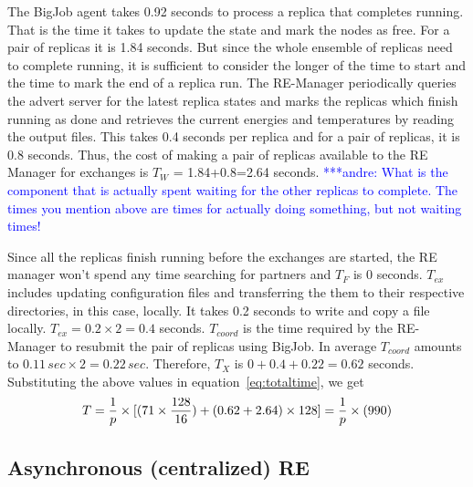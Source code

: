 \documentclass{rspublic}
\newcommand{\alnote}[1]{ {\textcolor{blue} { ***andre: #1 }}}
\newcommand{\alnote}[1]{}
\begin{document}
The BigJob agent takes 0.92 seconds to process a replica that
completes running.  That is the time it takes to update the state and
mark the nodes as free. For a pair of replicas it is 1.84 seconds. But
since the whole ensemble of replicas need to complete running, it is
sufficient to consider the longer of the time to start and the time to
mark the end of a replica run.  The RE-Manager periodically queries
the advert server for the latest replica states and marks the replicas
which finish running as done and retrieves the current energies and
temperatures by reading the output files. This takes 0.4 seconds per
replica and for a pair of replicas, it is 0.8 seconds.  Thus, the cost
of making a pair of replicas available to the RE Manager for exchanges
is $T_W$ = 1.84+0.8=2.64 seconds.  \alnote{What is the component that
  is actually spent waiting for the other replicas to complete. The
  times you mention above are times for actually doing something, but
  not waiting times!}

Since all the replicas finish running before the exchanges are
started, the RE manager won't spend any time searching for partners
and $T_F$ is 0 seconds. $T_{ex}$ includes updating configuration files
and transferring the them to their respective directories, in this
case, locally. It takes 0.2 seconds to write and copy a file
locally. $T_{ex} = 0.2 \times 2=0.4$ seconds. $T_{coord}$ is the time
required by the RE-Manager to resubmit the pair of replicas using
BigJob. In average $T_{coord}$ amounts to $0.11\,sec \times 2 =
0.22\,sec$. Therefore, $T_{X}$ is $0+0.4+0.22=0.62$ seconds.
Substituting the above values in equation~\ref{eq:totaltime}, we get
\begin{eqnarray}
  T=  {1 \over p} \times {[ {(71\times {128\over 16}})+ (0.62 + 2.64)\times 128]} = {1 \over p} \times (990)
\label{eq:sync}
\end{eqnarray}


\subsection{Asynchronous (centralized) RE}

\end{document}

